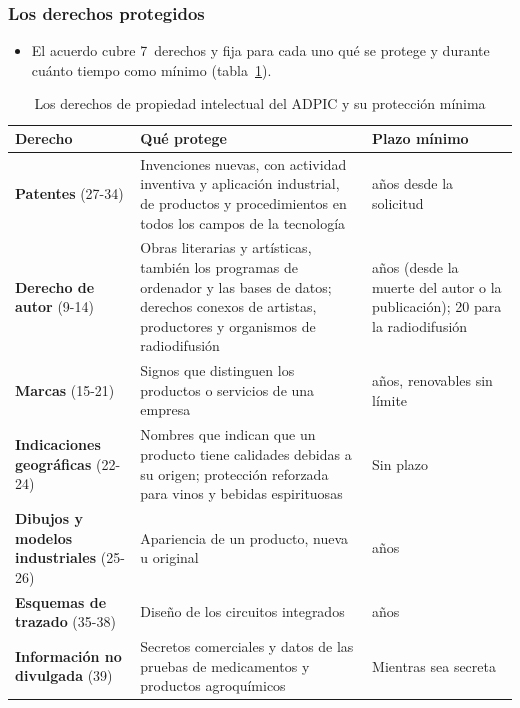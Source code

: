 \documentclass[11pt]{article}
\begin{document}
\subsubsection{Los derechos protegidos}\label{sec:adpic-derechos}

\begin{itemize}
\item El acuerdo cubre 7~derechos y fija para cada uno qué se protege y durante cuánto tiempo como mínimo (tabla~\ref{tab:derechos}).
\end{itemize}

\begin{table}[H]
\centering
\caption{Los derechos de propiedad intelectual del ADPIC y su protección mínima}\label{tab:derechos}
\small
\begin{tabular}{>{\raggedright\arraybackslash}m{3.3cm}>{\raggedright\arraybackslash}m{7.8cm}>{\raggedright\arraybackslash}m{3.2cm}}
\toprule
\rowcolor{tceeazulpalido} \textbf{Derecho} & \textbf{Qué protege} & \textbf{Plazo mínimo}\\
\midrule
\textcolor{tceemorado}{\textbf{Patentes}} (27-34) & Invenciones nuevas, con actividad inventiva y aplicación industrial, de productos y procedimientos en todos los campos de la tecnología & 20 años desde la solicitud\\
\addlinespace[0.2em]
\textcolor{tceemorado}{\textbf{Derecho de autor}} (9-14) & Obras literarias y artísticas, también los programas de ordenador y las bases de datos; derechos conexos de artistas, productores y organismos de radiodifusión & 50 años (desde la muerte del autor o la publicación); 20 para la radiodifusión\\
\addlinespace[0.2em]
\textcolor{tceeazul}{\textbf{Marcas}} (15-21) & Signos que distinguen los productos o servicios de una empresa & 7 años, renovables sin límite\\
\addlinespace[0.2em]
\textcolor{tceeazul}{\textbf{Indicaciones geográficas}} (22-24) & Nombres que indican que un producto tiene calidades debidas a su origen; protección reforzada para vinos y bebidas espirituosas & Sin plazo\\
\addlinespace[0.2em]
\textcolor{tceeverde}{\textbf{Dibujos y modelos industriales}} (25-26) & Apariencia de un producto, nueva u original & 10 años\\
\addlinespace[0.2em]
\textcolor{tceeverde}{\textbf{Esquemas de trazado}} (35-38) & Diseño de los circuitos integrados & 10 años\\
\addlinespace[0.2em]
\textcolor{tceeverde}{\textbf{Información no divulgada}} (39) & Secretos comerciales y datos de las pruebas de medicamentos y productos agroquímicos & Mientras sea secreta\\
\bottomrule
\end{tabular}
\end{table}
\end{document}
